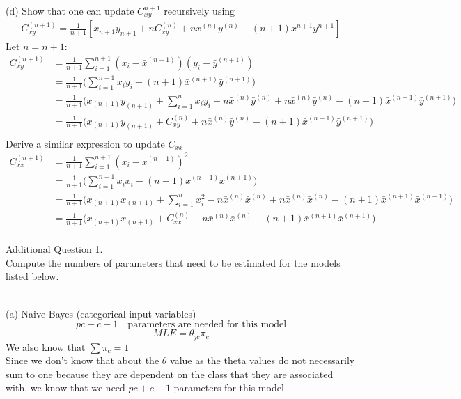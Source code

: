 \documentclass[draft]{exam} %
\theoremstyle{definition} \newtheorem*{defn}{Definition}
\begin{document}
\begin{questions}
\begin{solution}
(d) Show that one can update $C_{xy}^{n+1}$ recursively using
\begin{align*}
C_{xy}^{(n+1)} = \frac{1}{n+1}[x_{n+1}y_{n+1} + nC_{xy}^{(n)} + n\bar{x}^{(n)}\bar{y}^{(n)} - (n+1)\bar{x}^{n+1}\bar{y}^{n+1}]
\end{align*}
Let $n = n+1$:
\begin{align*}
C_{xy}^{(n+1)} & = \frac{1}{n+1} \sum_{i=1}^{n+1} (x_i-\bar{x}^{(n+1)})(y_i - \bar{y}^{(n+1)}) \\
& = \frac{1}{n+1} \Big( \sum_{i=1}^{n+1} x_i y_i - (n+1) \bar{x}^{(n+1)} \bar{y}^{(n+1)} \Big) \\
& = \frac{1}{n+1} \Big( x_{(n+1)} y_{(n+1)} + \sum_{i=1}^{n} x_i y_i - n\bar{x}^{(n)}\bar{y}^{(n)} + n\bar{x}^{(n)}\bar{y}^{(n)} - (n+1)\bar{x}^{(n+1)}\bar{y}^{(n+1)} \Big)\\
& = \frac{1}{n+1} \Big( x_{(n+1)} y_{(n+1)} + C_{xy}^{(n)} + n\bar{x}^{(n)}\bar{y}^{(n)} - (n+1)\bar{x}^{(n+1)}\bar{y}^{(n+1)} \Big)\\
\end{align*}
Derive a similar expression to update $C_{xx}$
\begin{align*}
C_{xx}^{(n+1)} & = \frac{1}{n+1} \sum_{i=1}^{n+1} (x_i-\bar{x}^{(n+1)})^2 \\
& = \frac{1}{n+1} \Big( \sum_{i=1}^{n+1} x_i x_i - (n+1) \bar{x}^{(n+1)}\bar{x}^{(n+1)} \Big) \\
& = \frac{1}{n+1} \Big( x_{(n+1)} x_{(n+1)} + \sum_{i=1}^{n} x_i^2 - n\bar{x}^{(n)}\bar{x}^{(n)} + n\bar{x}^{(n)}\bar{x}^{(n)} - (n+1)\bar{x}^{(n+1)}\bar{x}^{(n+1)} \Big)\\
& = \frac{1}{n+1} \Big( x_{(n+1)} x_{(n+1)} + C_{xx}^{(n)} + n\bar{x}^{(n)}\bar{x}^{(n)} - (n+1)\bar{x}^{(n+1)}\bar{x}^{(n+1)} \Big)\\
\end{align*}
\end{solution}


\question Additional Question 1. \\
Compute the numbers of parameters that need to be estimated for the models listed below. \\

\begin{solution}  \\%
(a) Naive Bayes (categorical input variables) \\
$$pc + c -1 \quad \text{parameters are needed for this model}$$
$$MLE = \theta_{jc} \pi_c$$
We also know that $\sum{\pi_c} = 1$\\
Since we don't know that about the $\theta$ value as the theta values do not necessarily sum to one because they are dependent on the class that they are associated with, we know that we need $pc + c -1$ parameters for this model\\


\end{solution}
\end{questions}
\end{document}

